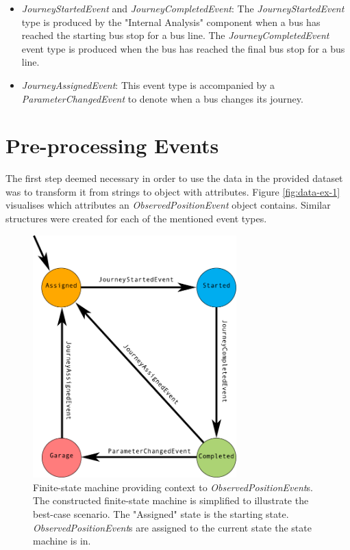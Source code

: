 \begin{itemize}
    \item \textit{JourneyStartedEvent} and \textit{JourneyCompletedEvent}:
    The \textit{JourneyStartedEvent} type is produced by the "Internal Analysis" component when a bus has reached the starting bus stop for a bus line.
    The \textit{JourneyCompletedEvent} event type is produced when the bus has reached the final bus stop for a bus line.

    \item \textit{JourneyAssignedEvent}:
    This event type is accompanied by a \textit{ParameterChangedEvent} to denote when a bus changes its journey.
\end{itemize}

\section{Pre-processing Events}
The first step deemed necessary in order to use the data in the provided dataset was to transform it from strings to object with attributes.
Figure \ref{fig:data-ex-1} visualises which attributes an \textit{ObservedPositionEvent} object contains.
Similar structures were created for each of the mentioned event types.

\begin{figure}[ht!]
    \centering
    \includegraphics[width=0.7\textwidth]{figures/context-state-machine}
    \caption{Finite-state machine providing context to \textit{ObservedPositionEvent}s. 
    The constructed finite-state machine is simplified to illustrate the best-case scenario.
    The "Assigned" state is the starting state.
    \textit{ObservedPositionEvent}s are assigned to the current state the state machine is in.
    }
    \label{fig:context-state-machine}
\end{figure}

